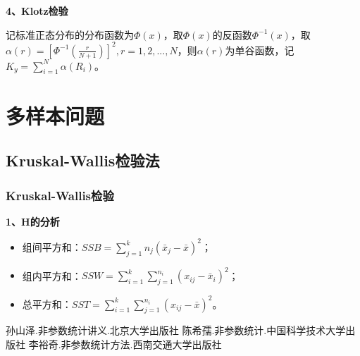 \documentclass[lang=cn,10pt]{elegantbook}
\begin{document}
\textbf{4、Klotz检验}

记标准正态分布的分布函数为$\Phi(x)$，取$\Phi(x)$的反函数$\Phi^{-1}(x)$，取$\alpha(r) = [\Phi^{-1}(\frac{r}{N+1})]^2,r = 1,2,...,N$，则$\alpha(r)$为单谷函数，记$K_y = \sum_{i = 1}^N\alpha(R_i)$。

\chapter{多样本问题}
\section{Kruskal-Wallis检验法}
\subsection{Kruskal-Wallis检验}
\textbf{1、H的分析}

\begin{itemize}
    \item 组间平方和：$SSB = \sum_{j = 1}^kn_j (\bar{x}_j - \bar{x})^2$；
    \item 组内平方和：$SSW = \sum_{i = 1}^k\sum_{j = 1}^{n_i}(x_{ij} - \bar{x}_i)^2$；
    \item 总平方和：$SST = \sum_{i = 1}^k\sum_{j = 1}^{n_i}(x_{ij} - \bar{x})^2$。
\end{itemize}









\begin{thebibliography}{3}
    孙山泽.非参数统计讲义.北京大学出版社
    陈希孺.非参数统计.中国科学技术大学出版社
    李裕奇.非参数统计方法.西南交通大学出版社
\end{thebibliography}
\end{document}
